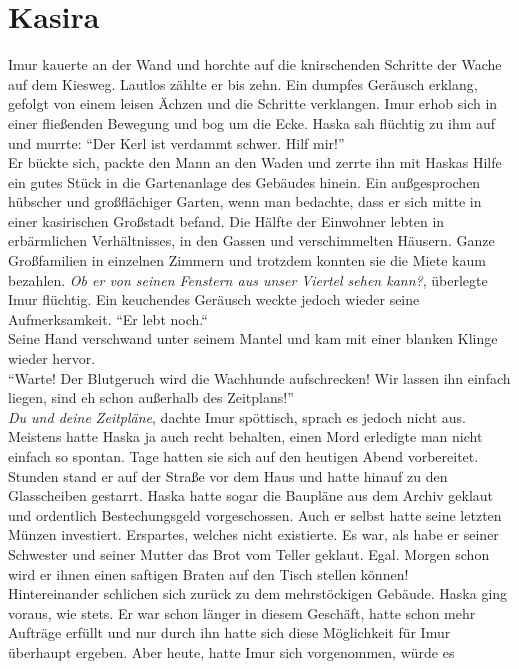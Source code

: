 \chapter{Kasira}

Imur kauerte an der Wand und horchte auf die knirschenden Schritte der Wache auf dem Kiesweg. 
Lautlos zählte er bis zehn. Ein dumpfes Geräusch erklang, gefolgt von einem leisen Ächzen und die 
Schritte verklangen. Imur erhob sich in einer fließenden Bewegung und bog um die Ecke. Haska 
sah flüchtig zu ihm auf und murrte: ``Der Kerl ist verdammt schwer. Hilf mir!''\\
Er bückte sich, packte den Mann an den Waden und zerrte ihn mit Haskas Hilfe ein gutes Stück in 
die Gartenanlage des Gebäudes hinein. Ein außgesprochen hübscher und großflächiger Garten, wenn man 
bedachte, dass er sich mitte in einer kasirischen Großstadt befand. Die Hälfte der Einwohner lebten 
in erbärmlichen Verhältnisses, in den Gassen und verschimmelten Häusern. Ganze Großfamilien in 
einzelnen Zimmern und trotzdem konnten sie die Miete kaum bezahlen. \textit{Ob er von seinen 
Fenstern aus unser Viertel sehen kann?}, überlegte Imur flüchtig. Ein keuchendes Geräusch weckte 
jedoch wieder seine Aufmerksamkeit. ``Er lebt noch.``\\
Seine Hand verschwand unter seinem Mantel und kam mit einer blanken Klinge wieder hervor.\\
``Warte! Der Blutgeruch wird die Wachhunde aufschrecken! Wir lassen ihn einfach liegen, sind eh 
schon außerhalb des Zeitplans!''\\
\textit{Du und deine Zeitpläne}, dachte Imur spöttisch, sprach es jedoch nicht aus. Meistens hatte 
Haska ja auch recht behalten, einen Mord erledigte man nicht einfach so spontan. Tage hatten sie 
sich auf den heutigen Abend vorbereitet. Stunden stand er auf der Straße vor dem Haus und hatte 
hinauf zu den Glasscheiben gestarrt. Haska hatte sogar die Baupläne aus dem Archiv geklaut und 
ordentlich Bestechungsgeld vorgeschossen. Auch er selbst hatte seine letzten Münzen investiert. 
Erspartes, welches nicht existierte. Es war, als habe er seiner Schwester und seiner Mutter das 
Brot vom Teller geklaut. Egal. Morgen schon wird er ihnen einen saftigen Braten auf den Tisch 
stellen können!\\
Hintereinander schlichen sich zurück zu dem mehrstöckigen Gebäude. Haska ging voraus, wie stets. Er 
war schon länger in diesem Geschäft, hatte schon mehr Aufträge erfüllt und nur durch ihn hatte sich 
diese Möglichkeit für Imur überhaupt ergeben. Aber heute, hatte Imur sich vorgenommen, würde es 
